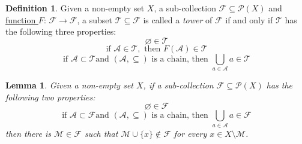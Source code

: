 \documentclass{article}
\numberwithin{equation}{section}
\theoremstyle{plain} %
\newtheorem{lemma}[equation]{Lemma}
\theoremstyle{definition}
\newtheorem{definition}[equation]{Definition}
\theoremstyle{remark}
\begin{document}
\begin{definition}
Given a non-empty set $X$, a sub-collection $\mathcal{F} \subseteq \mathcal{P}(X)$ and \hyperref[definition:B_star]{function $F$}: $\mathcal{F} \to \mathcal{F}$, a subset  $\mathcal{T} \subseteq \mathcal{F}$ is called a \textit{tower} of $\mathcal{F}$ if and only if $\mathcal{T}$ has the following three properties: \label{definition:tower}
	\begin{equation*}
	    \varnothing \in \mathcal{T} \tag{3.3.1}\label{definition:3.3.1}
	\end{equation*}
	\begin{equation*}
	   \text{if }\mathcal{A} \in \mathcal{T}, \text{ then } F(\mathcal{A}) \in \mathcal{T} \tag{3.3.2}\label{definition:3.3.2}
	\end{equation*}
	\begin{equation*}
	    \text{if }\mathcal{A} \subset \mathcal{T} \text{and } (\mathcal{A}, \subseteq) \text{ is a chain, then } \bigcup_{a \in \mathcal{A}}a \in \mathcal{T} \tag{3.3.3}\label{definition:3.3.3}
	\end{equation*}
\end{definition}

\begin{lemma}
Given a non-empty set $X$, if a sub-collection $\mathcal{F} \subseteq \mathcal{P}(X)$ has the following two properties: \label{lemma:FF}
	\begin{equation*}
	    \varnothing \in \mathcal{F} \tag{3.4.1}\label{lemma:3.4.1}
	\end{equation*}
	\begin{equation*}
	    \text{if }\mathcal{A} \subset \mathcal{F} \text{and } (\mathcal{A}, \subseteq) \text{ is a chain, then } \bigcup_{a \in \mathcal{A}}a \in \mathcal{F} \tag{3.4.2}\label{lemma:3.4.2}
	\end{equation*}
then there is $\mathcal{M} \in \mathcal{F}$ such that $\mathcal{M} \cup \{x\} \notin \mathcal{F}$  for every $x \in X \setminus \mathcal{M}$. 
\end{lemma}
\end{document}
